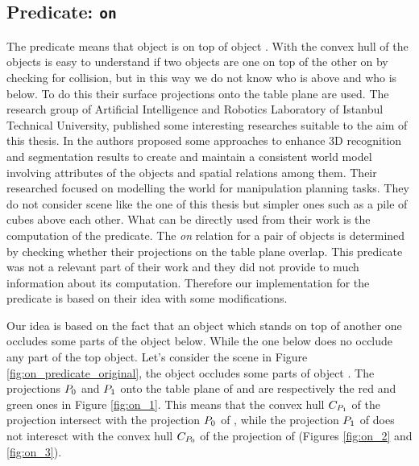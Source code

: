 \subsection{Predicate: \texttt{on}}
The  predicate means that object  is on top of object . With the convex hull of the objects is easy to understand if two objects are one on top of the other on by checking for collision, but in this way we do not know who is above and who is below. To do this their surface projections onto the table plane are used. 
The research group of Artificial Intelligence and Robotics Laboratory of
Istanbul Technical University, published some interesting researches suitable to the aim of this thesis. In \citep{ersen2014scene} \citep{SSS147762} \citep{ersen2013extracting} the authors proposed some approaches to enhance
 3D recognition and segmentation results to create and maintain a consistent world model involving attributes of the objects and spatial relations among them. Their researched focused on modelling the world for manipulation planning tasks. They do not consider scene like the one of this thesis but simpler ones such as  a pile of cubes above each other. What can be directly used from their work is the computation of the  predicate. The \textit{on} relation for a pair of objects is determined by checking whether their projections on the table plane overlap. This predicate was not a relevant part of their work and they did not provide to much information about its computation. Therefore our implementation for the  predicate is based on their idea with some modifications. 
 
Our idea is based on the fact that an object which stands on top of another one occludes some parts of the object below. While the one below does no occlude any part of the top object. 
Let's consider the scene in Figure \ref{fig:on_predicate_original}, the object  occludes some parts of object . The projections ${\sc P_{0}}$ and ${\sc P_{1}}$ onto the table plane of  and  are respectively the red and green ones in Figure \ref{fig:on_1}. This means that the convex hull ${\sc C_{P_{1}}}$ of the projection  intersect with the projection ${\sc P_{0}}$ of , while the projection ${\sc P_{1}}$ of  does not interesct with the convex hull ${\sc C_{P_{0}}}$ of the projection of  (Figures \ref{fig:on_2} and \ref{fig:on_3}). 



